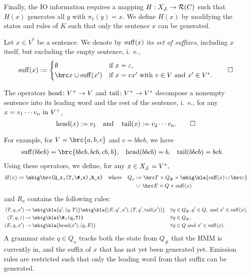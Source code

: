 Finally, the IO information requires a mapping $H: X_{\not\bot}\to\mathcal R(C)$ such
that $H(x)$ generates all $y$ with $\pi_1(y)=x$. We define $H(x)$ by
modifying the states and rules of $K$ such that only the sentence $x$ can be
generated.

\begin{definition}
 Let $x\in V^*$ be a sentence. We denote by $\operatorname{suff}(x)$ its
 \emph{set of suffixes}, including $x$ itself, but excluding the empty sentence, i.~e.,
 \[
  \suff(x) := \begin{cases}
   \emptyset & \text{if } x = \eps, \\
   \brc x \cup \suff(x') & \text{if } x = vx' \text{ with } v\in V\text{ and }x'\in V^*.
  \end{cases}\qedhere
 \]
\end{definition}

\begin{definition}
 The operators $\operatorname{head}\colon V^+\to V$ and $\operatorname{tail}\colon V^+\to V^*$ decompose a nonempty sentence into its leading word and the rest of the sentence, i.~e., for any $x = v_1\cdots v_n\text{ in } V^+$,
 \[
  \operatorname{head}(x) := v_1
  \quad\text{and}\quad
  \operatorname{tail}(x) := v_2\cdots v_n.
  \qedhere
 \]
\end{definition}

For example, for $V = \brc{a,b,c}$ and $v = bbcb$, we have
\begin{align*}
 \suff(bbcb) &= \brc{bbcb, bcb, cb, b}, &
 \car(bbcb) &= b, &
 \cdr(bbcb) &= bcb.
\end{align*}
Using these operators, we define, for any $x\in X_{\not\bot} = V^*$,
\begin{align*}
 H(x) := \mbig\brc{Q_x,(T,\#,x),R_x} \quad\text{where}\quad
 Q_x &:= \brc T \times Q_\# \times \mbig\kla{\suff(x)\cup\brc\eps} \\
 &\hspace{0.15em}\cup\hspace{0.15em} \brc E \times Q \times \suff(x)
\end{align*}
and $R_x$ contains the following rules:
\label{eq:03-R_x}\begin{align*}
 (T,q,x') &\to \mbig\kla{q',(q,T)}\mbig\kla{(E,q',x'),(T,q',\cdr(x'))} && \forall q\in Q_\#,q'\in Q,\text{ and }x'\in\suff(x), \\
 (T,q,\eps) &\to \mbig\kla{\#,(q,T)} && \forall q\in Q_\#, \\
 (E,q,x') &\to \mbig\kla{\car(x'),(q,E)} && \forall q\in Q\text{ and }x'\in\suff(x).
\end{align*}
%
A grammar state $q\in Q_x$ tracks both the state from $Q_\#$ that the HMM is
currently in, and the suffix of $x$ that has not yet been generated yet. Emission
rules are restricted such that only the leading word from that suffix can be generated.

